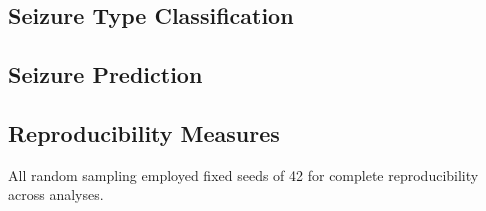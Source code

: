 
\subsection{Seizure Type Classification}
\subsection{Seizure Prediction}

\subsection{Reproducibility Measures}
All random sampling employed fixed seeds of 42 for complete reproducibility across analyses.

\label{sec:methods}


